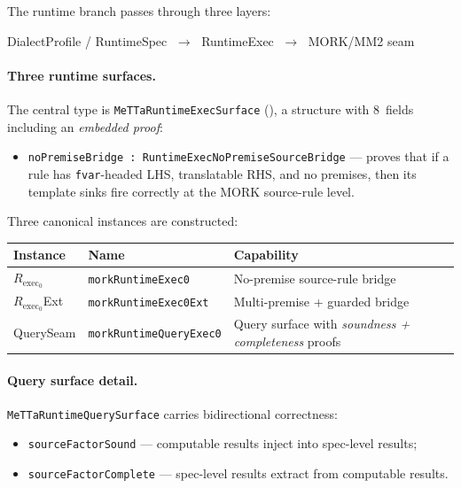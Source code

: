\documentclass[11pt]{article}
\theoremstyle{remark}
\newcommand{\MORK}{\textup{MORK}}
\newcommand{\code}[1]{\texttt{#1}}
\newcommand{\codepath}[1]{\path{#1}}
\newcommand{\leanref}[1]{\texttt{#1}}
\begin{document}
The runtime branch passes through three layers:

\begin{center}
DialectProfile / RuntimeSpec $\;\to\;$ RuntimeExec $\;\to\;$ \MORK{}/MM2 seam
\end{center}

\paragraph{Three runtime surfaces.}
The central type is \leanref{MeTTaRuntimeExecSurface}
(\codepath{RuntimeExec.lean}), a structure with 8~fields including an
\emph{embedded proof}:

\begin{itemize}[nosep]
  \item \leanref{noPremiseBridge : RuntimeExecNoPremiseSourceBridge} ---
  proves that if a rule has \code{fvar}-headed LHS, translatable RHS, and
  no premises, then its template sinks fire correctly at the
  \MORK{} source-rule level.
\end{itemize}

Three canonical instances are constructed:

\begin{center}
\begin{tabular}{@{}llp{5.5cm}@{}}
\toprule
Instance & Name & Capability \\
\midrule
$R_{\mathrm{exec}_0}$ & \leanref{morkRuntimeExec0} &
  No-premise source-rule bridge \\
$R_{\mathrm{exec}_0}$Ext & \leanref{morkRuntimeExec0Ext} &
  Multi-premise + guarded bridge \\
QuerySeam & \leanref{morkRuntimeQueryExec0} &
  Query surface with \emph{soundness + completeness} proofs \\
\bottomrule
\end{tabular}
\end{center}

\paragraph{Query surface detail.}
\leanref{MeTTaRuntimeQuerySurface}
carries bidirectional correctness:
\begin{itemize}[nosep]
  \item \leanref{sourceFactorSound} --- computable results inject into
  spec-level results;
  \item \leanref{sourceFactorComplete} --- spec-level results extract from
  computable results.
\end{itemize}
\end{document}
